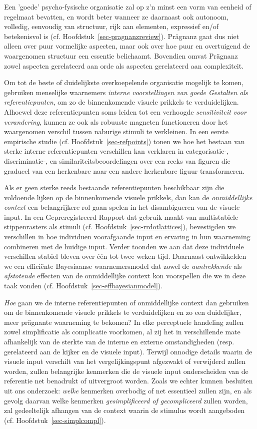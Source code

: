 Een 'goede' psycho-fysische organisatie zal op z’n minst een vorm van eenheid of regelmaat bevatten, en wordt beter wanneer ze daarnaast ook autonoom, volledig, eenvoudig van structuur, rijk aan elementen, expressief en/of betekenisvol is (cf. Hoofdstuk~\ref{sec-pragnanzreview}). Prägnanz gaat dus niet alleen over puur vormelijke aspecten, maar ook over hoe puur en overtuigend de waargenomen structuur een essentie belichaamt. Bovendien omvat Prägnanz zowel aspecten gerelateerd aan orde als aspecten gerelateerd aan complexiteit. 

Om tot de beste of duidelijkste overkoepelende organisatie mogelijk te komen, gebruiken menselijke waarnemers \textit{interne voorstellingen van goede Gestalten als referentiepunten}, om zo de binnenkomende visuele prikkels te verduidelijken. Alhoewel deze referentiepunten soms leiden tot een verhoogde \textit{sensitiviteit voor verandering}, kunnen ze ook als robuuste magneten functioneren door het waargenomen verschil tussen naburige stimuli te verkleinen. In een eerste empirische studie (cf. Hoofdstuk~\ref{sec-refpoints}) tonen we hoe het bestaan van sterke interne referentiepunten verschillen kan verklaren in categorisatie-, discriminatie-, en similariteitsbeoordelingen over een reeks van figuren die gradueel van een herkenbare naar een andere herkenbare figuur transformeren. 

Als er geen sterke reeds bestaande referentiepunten beschikbaar zijn die voldoende lijken op de binnenkomende visuele prikkels, dan kan de \textit{onmiddellijke context} een belangrijkere rol gaan spelen in het disambigueren van de visuele input. In een Gepreregistreerd Rapport dat gebruik maakt van multistabiele stippenrasters als stimuli (cf. Hoofdstuk~\ref{sec-rrdotlattices}), bevestigden we verschillen in hoe individuen voorafgaande input en ervaring in hun waarneming combineren met de huidige input. Verder toonden we aan dat deze individuele verschillen stabiel bleven over één tot twee weken tijd. Daarnaast ontwikkelden we een efficiënte Bayesiaanse waarnemersmodel dat zowel de \textit{aantrekkende} als \textit{afstotende} effecten van de onmiddellijke context kon voorspellen die we in deze taak vonden (cf. Hoofdstuk~\ref{sec-effbayesianmodel}).

\textit{Hoe} gaan we de interne referentiepunten of onmiddellijke context dan gebruiken om de binnenkomende visuele prikkels te verduidelijken en zo een duidelijker, meer prägnante waarneming te bekomen? In elke perceptuele handeling zullen zowel simplificatie als complicatie voorkomen, al zij het in verschillende mate afhankelijk van de sterkte van de interne en externe omstandigheden (resp. gerelateerd aan de kijker en de visuele input). Terwijl onnodige details waarin de visuele input verschilt van het vergelijkingspunt afgezwakt of verwijderd zullen worden, zullen belangrijke kenmerken die de visuele input onderscheiden van de referentie net benadrukt of uitvergroot worden. Zoals we echter kunnen besluiten uit ons onderzoek: \textit{welke} kenmerken overbodig of net essentieel zullen zijn, en als gevolg daarvan welke kenmerken \textit{gesimplificeerd of gecompliceerd} zullen worden, zal gedeeltelijk afhangen van de context waarin de stimulus wordt aangeboden (cf. Hoofdstuk~\ref{sec-simplcompl}).  

